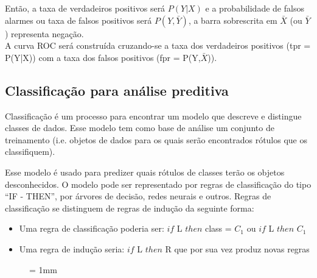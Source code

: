 Então, a taxa de verdadeiros positivos será $P(Y|X)$ e a probabilidade de falsos alarmes ou taxa de falsos positivos será $P(Y,\bar{Y})$, a barra sobrescrita em $\bar{X}$
(ou $\bar{Y}$) representa negação. \\
A curva ROC será construída cruzando-se a taxa dos verdadeiros positivos (tpr = P(Y|X)) com a taxa dos falsos positivos (fpr = P(Y,$\bar{X}$)).


\pagebreak

\subsection{Classificação para análise preditiva}

Classificação é um processo para encontrar um modelo que descreve e distingue classes de dados. 
Esse modelo tem como base de análise um conjunto de treinamento (i.e. objetos de dados para os quais 
serão encontrados rótulos que os classifiquem). 

Esse modelo é usado para predizer quais rótulos de classes terão os objetos desconhecidos.
O modelo pode ser representado por regras de classificação do tipo ``IF - THEN'', por árvores de decisão, redes neurais e outros. 
Regras de classificação se distinguem de regras de indução da seguinte forma:
\begin{itemize}
	\item Uma regra de classificação poderia ser: $if$ L $then$ class = $C_{1}$ ou $if$ L $then$  $C_{1}$
	\item Uma regra de indução seria: $ if$ L $then$ R que por sua vez produz novas regras 
\end{itemize}


\begin{figure}[ht] \unitlength= 1mm \thicklines
\end{figure}

\vspace{3cm} 

